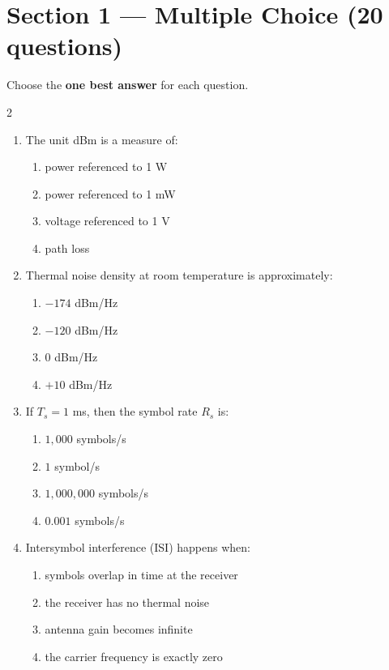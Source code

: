\section*{Section 1 --- Multiple Choice (20 questions)}
Choose the \textbf{one best answer} for each question.

\vspace{0.3cm}
\begin{multicols}{2}
\begin{enumerate}[leftmargin=*, itemsep=0.4em]
\item The unit dBm is a measure of:
\begin{enumerate}[label=\alph*)]
\item power referenced to 1 W
\item power referenced to 1 mW
\item voltage referenced to 1 V
\item path loss
\end{enumerate}

\item Thermal noise density at room temperature is approximately:
\begin{enumerate}[label=\alph*)]
\item $-174$ dBm/Hz
\item $-120$ dBm/Hz
\item $0$ dBm/Hz
\item $+10$ dBm/Hz
\end{enumerate}

\item If $T_s = 1$ ms, then the symbol rate $R_s$ is:
\begin{enumerate}[label=\alph*)]
\item $1{,}000$ symbols/s
\item $1$ symbol/s
\item $1{,}000{,}000$ symbols/s
\item $0.001$ symbols/s
\end{enumerate}

\item Intersymbol interference (ISI) happens when:
\begin{enumerate}[label=\alph*)]
\item symbols overlap in time at the receiver
\item the receiver has no thermal noise
\item antenna gain becomes infinite
\item the carrier frequency is exactly zero
\end{enumerate}


\end{enumerate}
\end{multicols}
